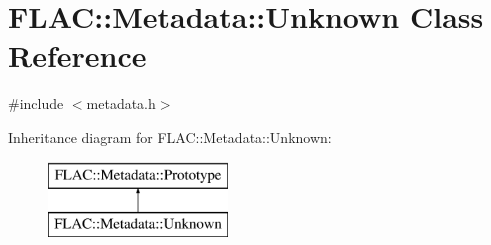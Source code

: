 \hypertarget{class_f_l_a_c_1_1_metadata_1_1_unknown}{}\section{F\+L\+AC\+:\+:Metadata\+:\+:Unknown Class Reference}
\label{class_f_l_a_c_1_1_metadata_1_1_unknown}


{\ttfamily \#include $<$metadata.\+h$>$}

Inheritance diagram for F\+L\+AC\+:\+:Metadata\+:\+:Unknown\+:\begin{figure}[H]
\begin{center}
\leavevmode
\includegraphics[height=2.000000cm]{class_f_l_a_c_1_1_metadata_1_1_unknown}
\end{center}
\end{figure}
